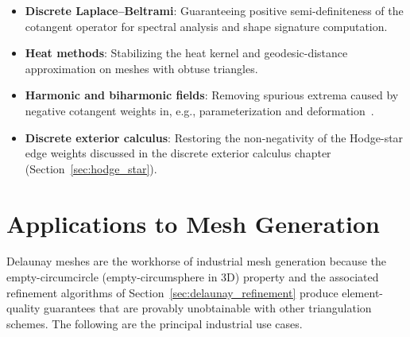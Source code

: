\begin{itemize}
\item \textbf{Discrete Laplace--Beltrami}: Guaranteeing positive semi-definiteness of the cotangent operator for spectral analysis and shape signature computation.
\item \textbf{Heat methods}: Stabilizing the heat kernel and geodesic-distance approximation on meshes with obtuse triangles.
\item \textbf{Harmonic and biharmonic fields}: Removing spurious extrema caused by negative cotangent weights in, e.g., parameterization and deformation~\cite{bobenko2007}.
\item \textbf{Discrete exterior calculus}: Restoring the non-negativity of the Hodge-star edge weights discussed in the discrete exterior calculus chapter (Section~\ref{sec:hodge_star}).
\end{itemize}

\section{Applications to Mesh Generation}
\label{sec:delaunay_mesh_applications}

Delaunay meshes are the workhorse of industrial mesh generation because the
empty-circumcircle (empty-circumsphere in 3D) property and the associated
refinement algorithms of Section~\ref{sec:delaunay_refinement} produce
element-quality guarantees that are provably unobtainable with other
triangulation schemes. The following are the principal industrial use cases.


